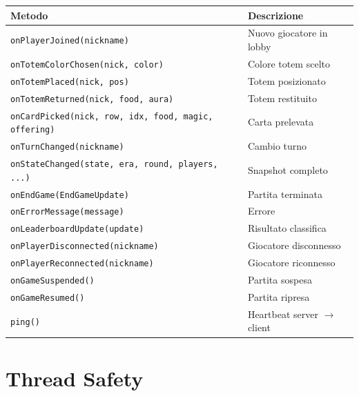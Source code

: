 \documentclass[a4paper,12pt]{article}
\newcommand{\code}[1]{\texttt{#1}}
\begin{document}
\begin{small}
\begin{tabularx}{\textwidth}{@{}p{7cm}X@{}}
\toprule
\textbf{Metodo} & \textbf{Descrizione} \\
\midrule
\code{onPlayerJoined(nickname)}          & Nuovo giocatore in lobby \\
\code{onTotemColorChosen(nick, color)}   & Colore totem scelto \\
\code{onTotemPlaced(nick, pos)}          & Totem posizionato \\
\code{onTotemReturned(nick, food, aura)} & Totem restituito \\
\code{onCardPicked(nick, row, idx, food, magic, offering)} & Carta prelevata \\
\code{onTurnChanged(nickname)}           & Cambio turno \\
\code{onStateChanged(state, era, round, players, ...)} & Snapshot completo \\
\code{onEndGame(EndGameUpdate)}          & Partita terminata \\
\code{onErrorMessage(message)}           & Errore \\
\code{onLeaderboardUpdate(update)}       & Risultato classifica \\
\code{onPlayerDisconnected(nickname)}    & Giocatore disconnesso \\
\code{onPlayerReconnected(nickname)}     & Giocatore riconnesso \\
\code{onGameSuspended()}                 & Partita sospesa \\
\code{onGameResumed()}                   & Partita ripresa \\
\code{ping()}                            & Heartbeat server $\to$ client \\
\bottomrule
\end{tabularx}
\end{small}

\newpage
\section{Thread Safety}
\end{document}
